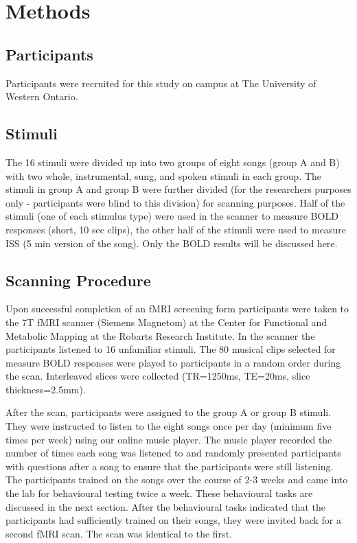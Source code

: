 \documentclass[12pt,letterpaper]{report}
\begin{document}
\section{Methods}
\subsection{Participants}
Participants were recruited for this study on campus at The University of Western Ontario. 
\subsection{Stimuli}
The 16 stimuli were divided up into two groups of eight songs (group A and B) with two whole, instrumental, sung, and spoken stimuli in each group.
The stimuli in group A and group B were further divided (for the researchers purposes only - participants were blind to this division) for scanning purposes. 
Half of the stimuli (one of each stimulus type) were used in the scanner to measure BOLD responses (short, 10 sec clips), the other half of the stimuli were used to measure ISS (5 min version of the song). Only the BOLD results will be discussed here. 
\subsection{Scanning Procedure}
Upon successful completion of an fMRI screening form participants were taken to the 7T fMRI scanner (Siemens Magnetom) at the Center for Functional and Metabolic Mapping at the Robarts Research Institute. 
In the scanner the participants listened to 16 unfamiliar stimuli. 
The 80 musical clips selected for measure BOLD responses were played to participants in a random order during the scan. 
Interleaved slices were collected (TR=1250ms, TE=20ms, slice thickness=2.5mm).

After the scan, participants were assigned to the group A or group B stimuli. They were instructed to listen to the eight songs once per day (minimum five times per week) using our online music player. 
The music player recorded the number of times each song was listened to and randomly presented participants with questions after a song to ensure that the participants were still listening. 
The participants trained on the songs over the course of 2-3 weeks and came into the lab for behavioural testing twice a week. These behavioural tasks are discussed in the next section. 
After the behavioural tasks indicated that the participants had sufficiently trained on their songs, they were invited back for a second fMRI scan. 
The scan was identical to the first.
\end{document}
